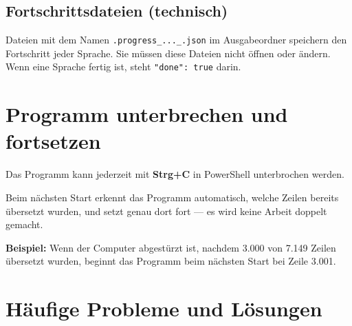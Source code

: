 \documentclass[a4paper,11pt]{article}
\newenvironment{erfolgbox}{%
  \begin{mdframed}[backgroundcolor=erfolg,linecolor=erfolgrand,linewidth=1pt,
    innerleftmargin=8pt,innerrightmargin=8pt,innertopmargin=6pt,innerbottommargin=6pt]
  \small}{%
  \end{mdframed}}
\begin{document}
\subsection{Fortschrittsdateien (technisch)}

Dateien mit dem Namen \texttt{.progress\_...\_.json} im Ausgabeordner speichern
den Fortschritt jeder Sprache. Sie müssen diese Dateien nicht öffnen oder ändern.
Wenn eine Sprache fertig ist, steht \texttt{"done": true} darin.

\section{Programm unterbrechen und fortsetzen}

Das Programm kann jederzeit mit \textbf{Strg+C} in PowerShell unterbrochen werden.

Beim nächsten Start erkennt das Programm automatisch, welche Zeilen bereits
übersetzt wurden, und setzt genau dort fort — es wird keine Arbeit doppelt gemacht.

\begin{erfolgbox}
\textbf{Beispiel:} Wenn der Computer abgestürzt ist, nachdem 3.000 von 7.149 Zeilen
übersetzt wurden, beginnt das Programm beim nächsten Start bei Zeile 3.001.
\end{erfolgbox}

\section{Häufige Probleme und Lösungen}
\end{document}
